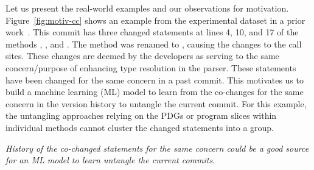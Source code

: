 
Let us present the real-world examples and our observations for
motivation. Figure~\ref{fig:motiv-cc} shows an example from the
experimental dataset in a prior work~\cite{flexeme-fse20}. This commit
has three changed statements at lines 4, 10, and 17 of the methods
, , and .  The
method  was renamed to
, causing the changes to the call sites.
These changes are deemed by the developers as serving to the same
concern/purpose of enhancing type resolution in the parser.  These
statements have been changed for the same concern in a past
commit. This motivates us to build a machine learning (ML) model to
learn from the co-changes for the same concern in the version history
to untangle the current commit. For this example, the untangling
approaches relying on the PDGs or program slices within individual
methods cannot cluster the changed statements into a group.


 {\em History of the co-changed statements
for the same concern could be a good source for an ML model to learn
untangle the current commits}.


